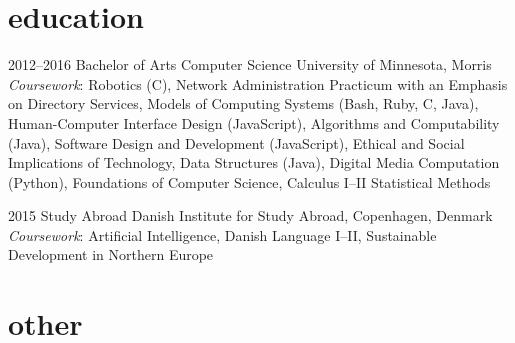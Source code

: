 \documentclass[]{cv-style} %
\begin{document}
\vspace{-0.2cm}
\section{education}

\begin{entrylist}


\entry
{2012--2016}
{Bachelor of Arts {\normalfont Computer Science}}
{University of Minnesota, Morris}
{\emph{Coursework}: \footnotesize{Robotics (C), Network Administration Practicum with an Emphasis on Directory Services, Models of Computing Systems (Bash, Ruby, C, Java), Human-Computer Interface Design (JavaScript), Algorithms and Computability (Java), Software Design and Development (JavaScript), Ethical and Social Implications of Technology, Data Structures (Java), Digital Media Computation (Python), Foundations of Computer Science, Calculus I--II Statistical Methods}}

\entry
{2015}
{Study Abroad}
{Danish Institute for Study Abroad, Copenhagen, Denmark}
{\emph{Coursework}: \footnotesize{Artificial Intelligence, Danish Language I--II, Sustainable Development in Northern Europe}}

\end{entrylist}


\section{other}
\end{document}
